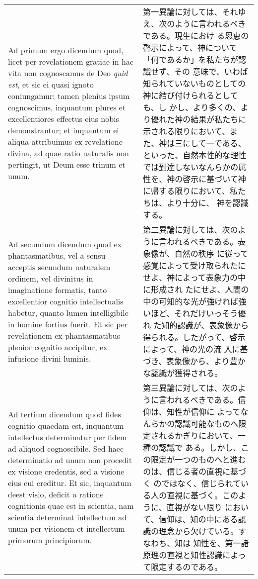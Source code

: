\documentclass[10pt]{jsarticle} %
\begin{document}
\begin{longtable}{p{21em}p{21em}}
{\sc Ad primum ergo dicendum} quod, licet per revelationem gratiae in
hac vita non cognoscamus de Deo {\it quid est}, et sic ei quasi ignoto
coniungamur; tamen plenius ipsum cognoscimus, inquantum plures et
excellentiores effectus eius nobis demonstrantur; et inquantum ei
aliqua attribuimus ex revelatione divina, ad quae ratio naturalis non
pertingit, ut Deum esse trinum et unum.

&

第一異論に対しては、それゆえ、次のように言われるべきである。現生におけ
る恩恵の啓示によって、神について「何であるか」を私たちが認識せず、その
意味で、いわば知られていないものとしての神に結び付けられるとしても、し
かし、より多くの、より優れた神の結果が私たちに示される限りにおいて、ま
た、神は三にして一である、といった、自然本性的な理性では到達しないなんらかの属
性を、神の啓示に基づいて神に帰する限りにおいて、私たちは、より十分に、
神を認識する。

\\

{\sc Ad secundum dicendum} quod ex phantasmatibus, vel a sensu
acceptis secundum naturalem ordinem, vel divinitus in imaginatione
formatis, tanto excellentior cognitio intellectualis habetur, quanto
lumen intelligibile in homine fortius fuerit. Et sic per revelationem
ex phantasmatibus plenior cognitio accipitur, ex infusione divini
luminis.

&

第二異論に対しては、次のように言われるべきである。表象像が、自然の秩序
に従って感覚によって受け取られたにせよ、神によって表象力の中に形成され
たにせよ、人間の中の可知的な光が強ければ強いほど、それだけいっそう優れ
た知的認識が、表象像から得られる。したがって、啓示によって、神の光の流
入に基づき、表象像から、より豊かな認識が獲得される。

\\

{\sc Ad tertium dicendum} quod fides cognitio quaedam est, inquantum
intellectus determinatur per fidem ad aliquod cognoscibile. Sed haec
determinatio ad unum non procedit ex visione credentis, sed a visione
eius cui creditur. Et sic, inquantum deest visio, deficit a ratione
cognitionis quae est in scientia, nam scientia determinat intellectum
ad unum per visionem et intellectum primorum principiorum.

&

第三異論に対しては、次のように言われるべきである。信仰は、知性が信仰に
よってなんらかの認識可能なものへ限定されるかぎりにおいて、一種の認識で
ある。しかし、この限定が一つのものへと進むのは、信じる者の直視に基づく
のではなく、信じられている人の直視に基づく。このように、直視がない限り
において、信仰は、知の中にある認識の理念から欠けている。すなわち、知は
知性を、第一諸原理の直視と知性認識によって限定するのである。

\end{longtable}
\end{document}
